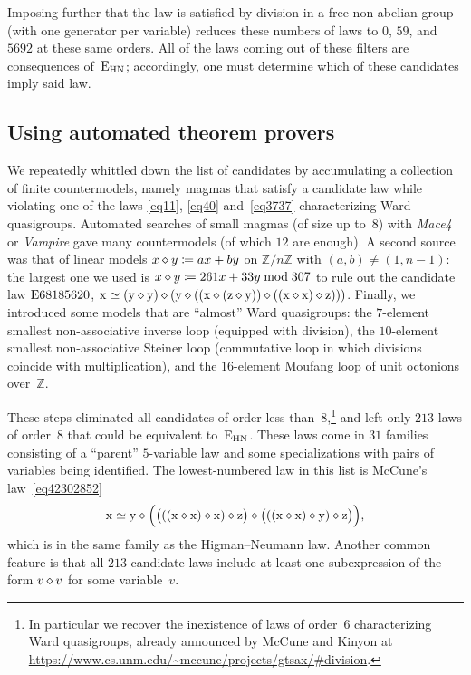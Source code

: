 Imposing further that the law is satisfied by division in a free non-abelian group (with one generator per variable) reduces these numbers of laws to $0$, $59$, and $\num{5692}$ at these same orders.  All of the laws coming out of these filters are consequences of~$\mathrm{E}_{\mathrm{HN}}$; accordingly, one must determine which of these candidates imply said law.

\subsection{Using automated theorem provers}

We repeatedly whittled down the list of candidates by accumulating a collection of finite countermodels, namely magmas that satisfy a candidate law while violating one of the laws \eqref{eq11}, \eqref{eq40} and~\eqref{eq3737} characterizing Ward quasigroups.  Automated searches of small magmas (of size up to~$8$) with \emph{Mace4} or \emph{Vampire} gave many countermodels (of which $12$ are enough).  A second source was that of linear models $x \diamond y \coloneqq ax+by$ on $\mathbb{Z}/n\mathbb{Z}$ with $(a,b)\neq(1,n-1)$: the largest one we used is $x \diamond y \coloneqq 261x + 33y \bmod 307$ to rule out the candidate law $\mathrm{E}68185620$, $\mathrm{x} \simeq (\mathrm{y} \diamond \mathrm{y}) \diamond (\mathrm{y} \diamond ((\mathrm{x} \diamond (\mathrm{z} \diamond \mathrm{y})) \diamond ((\mathrm{x} \diamond \mathrm{x}) \diamond \mathrm{z})))$.  Finally, we introduced some models that are ``almost'' Ward quasigroups: the $7$-element smallest non-associative inverse loop (equipped with division), the $10$-element smallest non-associative Steiner loop (commutative loop in which divisions coincide with multiplication), and the $16$-element Moufang loop of unit octonions over~$\mathbb{Z}$.

These steps eliminated all candidates of order less than~$8$,\footnote{In particular we recover the inexistence of laws of order~$6$ characterizing Ward quasigroups, already announced by McCune and Kinyon at \url{https://www.cs.unm.edu/~mccune/projects/gtsax/\#division}.} and left only $213$ laws of order~$8$ that could be equivalent to~$\mathrm{E}_{\mathrm{HN}}$.  These laws come in $31$ families consisting of a ``parent'' $5$-variable law and some specializations with pairs of variables being identified.  The lowest-numbered law in this list is McCune's law~\eqref{eq42302852}
\[
\mathrm{x} \simeq \mathrm{y} \diamond \Bigl(\bigl(((\mathrm{x} \diamond \mathrm{x}) \diamond \mathrm{x}) \diamond \mathrm{z}\bigr) \diamond \bigl(((\mathrm{x} \diamond \mathrm{x}) \diamond \mathrm{y}) \diamond \mathrm{z}\bigr)\Bigr) ,
\]
which is in the same family as the Higman--Neumann law.  Another common feature is that all $213$ candidate laws include at least one subexpression of the form $v \diamond v$ for some variable~$v$.

